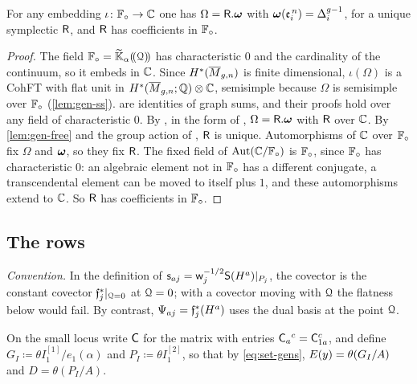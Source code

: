 \begin{prop}
\label{prop:gen-teleman}
For any embedding $\iota\colon\mathbb{F}_{\circ}\to\mathbb{C}$ one has $\Omega=\mathsf{R}.\boldsymbol{\omega}$ with $\boldsymbol{\omega}(\mathfrak{e}_i^{\,n})=\Delta_i^{g-1}$, for a unique symplectic $\mathsf{R}$, and $\mathsf{R}$ has coefficients in $\mathbb{F}_{\circ}$.
\end{prop}
\begin{proof}
The field $\mathbb{F}_{\circ}=\widetilde{\mathbb{K}}_{\alpha}(\!(\mathcal{Q})\!)$ has characteristic $0$ and the cardinality of the continuum, so it embeds in $\mathbb{C}$. Since $H^*(\overline{M}_{g,n})$ is finite dimensional, $\iota(\Omega)$ is a CohFT with flat unit in $H^*(\overline{M}_{g,n};\mathbb{Q})\otimes\mathbb{C}$, semisimple because $\Omega$ is semisimple over $\mathbb{F}_{\circ}$ (\cref{lem:gen-ss}). \cite[Defs.~2.2, 2.5, 2.13 and Prop.~2.14]{PPZ15} are identities of graph sums, and their proofs hold over any field of characteristic $0$. By \cite[Theorem (2) and Prop.~8.7(ii)]{Tel12}, in the form of \cite[Section~3.2]{PPZ15}, $\Omega=\mathsf{R}.\boldsymbol{\omega}$ with $\mathsf{R}$ over $\mathbb{C}$. By \cref{lem:gen-free} and the group action of \cite[Prop.~2.14]{PPZ15}, $\mathsf{R}$ is unique. Automorphisms of $\mathbb{C}$ over $\mathbb{F}_{\circ}$ fix $\Omega$ and $\boldsymbol{\omega}$, so they fix $\mathsf{R}$. The fixed field of $\operatorname{Aut}(\mathbb{C}/\mathbb{F}_{\circ})$ is $\mathbb{F}_{\circ}$, since $\mathbb{F}_{\circ}$ has characteristic $0$: an algebraic element not in $\mathbb{F}_{\circ}$ has a different conjugate, a transcendental element can be moved to itself plus $1$, and these automorphisms extend to $\mathbb{C}$. So $\mathsf{R}$ has coefficients in $\mathbb{F}_{\circ}$.
\end{proof}

\subsection{The rows}

\emph{Convention.} In the definition of $\mathsf{s}_{aj}=\mathsf{w}_j^{-1/2}\mathsf{S}(H^a)|_{P_j}$, the covector is the constant covector $\mathfrak{f}_j^*|_{\mathcal{Q}=0}$ at $\mathcal{Q}=0$; with a covector moving with $\mathcal{Q}$ the flatness below would fail. By contrast, $\Psi_{aj}=\mathfrak{f}_j^*(H^a)$ uses the dual basis at the point $\mathcal{Q}$.

On the small locus write $\mathsf{C}$ for the matrix with entries $\mathsf{C}_a{}^c=\mathsf{C}^c_{1a}$, and define $G_I\coloneqq\theta I_1^{[1]}/e_1(\alpha)$ and $P_I\coloneqq\theta I_1^{[2]}$, so that by \cref{eq:set-gens}, $E(y)=\theta(G_I/A)$ and $D=\theta(P_I/A)$.


